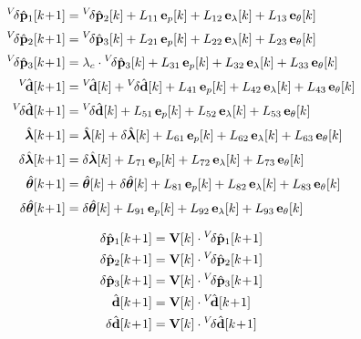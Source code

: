 \documentclass[UTF8,11pt,a4paper]{ctexart}
\newcommand{\Vk}{\mathbf{V}[k]}
\newcommand{\lc}{\lambda_c}
\newcommand{\Vdhat}{{}^V\!\hat{\mathbf{d}}}
\newcommand{\Vddhat}{{}^V\!\delta\hat{\mathbf{d}}}
\begin{document}
\begin{align}
{}^V\!\delta\hat{\mathbf{p}}_1[k\!+\!1]
&= {}^V\!\delta\hat{\mathbf{p}}_2[k] + L_{11}\,\mathbf{e}_p[k] + L_{12}\,\mathbf{e}_\lambda[k] + L_{13}\,\mathbf{e}_\theta[k] \notag\\[2pt]
{}^V\!\delta\hat{\mathbf{p}}_2[k\!+\!1]
&= {}^V\!\delta\hat{\mathbf{p}}_3[k] + L_{21}\,\mathbf{e}_p[k] + L_{22}\,\mathbf{e}_\lambda[k] + L_{23}\,\mathbf{e}_\theta[k] \notag\\[2pt]
{}^V\!\delta\hat{\mathbf{p}}_3[k\!+\!1]
&= \lc\cdot{}^V\!\delta\hat{\mathbf{p}}_3[k] + L_{31}\,\mathbf{e}_p[k] + L_{32}\,\mathbf{e}_\lambda[k] + L_{33}\,\mathbf{e}_\theta[k] \notag\\[2pt]
\Vdhat[k\!+\!1]
&= \Vdhat[k] + \Vddhat[k] + L_{41}\,\mathbf{e}_p[k] + L_{42}\,\mathbf{e}_\lambda[k] + L_{43}\,\mathbf{e}_\theta[k] \notag\\[2pt]
\Vddhat[k\!+\!1]
&= \Vddhat[k] + L_{51}\,\mathbf{e}_p[k] + L_{52}\,\mathbf{e}_\lambda[k] + L_{53}\,\mathbf{e}_\theta[k] \notag\\[2pt]
\hat{\bm{\lambda}}[k\!+\!1]
&= \hat{\bm{\lambda}}[k] + \delta\hat{\bm{\lambda}}[k] + L_{61}\,\mathbf{e}_p[k] + L_{62}\,\mathbf{e}_\lambda[k] + L_{63}\,\mathbf{e}_\theta[k] \notag\\[2pt]
\delta\hat{\bm{\lambda}}[k\!+\!1]
&= \delta\hat{\bm{\lambda}}[k] + L_{71}\,\mathbf{e}_p[k] + L_{72}\,\mathbf{e}_\lambda[k] + L_{73}\,\mathbf{e}_\theta[k] \notag\\[2pt]
\hat{\bm{\theta}}[k\!+\!1]
&= \hat{\bm{\theta}}[k] + \delta\hat{\bm{\theta}}[k] + L_{81}\,\mathbf{e}_p[k] + L_{82}\,\mathbf{e}_\lambda[k] + L_{83}\,\mathbf{e}_\theta[k] \notag\\[2pt]
\delta\hat{\bm{\theta}}[k\!+\!1]
&= \delta\hat{\bm{\theta}}[k] + L_{91}\,\mathbf{e}_p[k] + L_{92}\,\mathbf{e}_\lambda[k] + L_{93}\,\mathbf{e}_\theta[k] \notag
\end{align}

\begin{align}
\delta\hat{\mathbf{p}}_1[k\!+\!1] &= \Vk\cdot{}^V\!\delta\hat{\mathbf{p}}_1[k\!+\!1] \notag\\
\delta\hat{\mathbf{p}}_2[k\!+\!1] &= \Vk\cdot{}^V\!\delta\hat{\mathbf{p}}_2[k\!+\!1] \notag\\
\delta\hat{\mathbf{p}}_3[k\!+\!1] &= \Vk\cdot{}^V\!\delta\hat{\mathbf{p}}_3[k\!+\!1] \notag\\
\hat{\mathbf{d}}[k\!+\!1] &= \Vk\cdot\Vdhat[k\!+\!1] \notag\\
\delta\hat{\mathbf{d}}[k\!+\!1] &= \Vk\cdot\Vddhat[k\!+\!1] \notag
\end{align}
\end{document}
